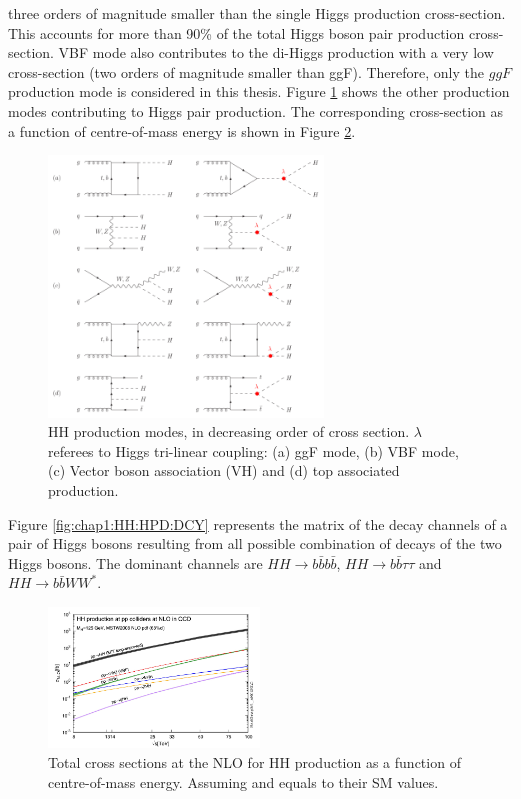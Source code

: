 three orders of magnitude smaller than the single Higgs production cross-section. This accounts for more than 90\% of the total Higgs boson pair production cross-section. VBF mode also contributes to the di-Higgs production with a very low cross-section (two orders of magnitude smaller than ggF). Therefore, only the $ggF$ production mode is considered in this thesis. Figure \ref{fig:chap1:HH:HPD:FYS} shows the other production modes contributing to Higgs pair production. The corresponding cross-section as a function of centre-of-mass energy is shown in Figure \ref{fig:chap1:HH:BSM:XSEC:S}. \\
\begin{figure}[htbp]
    \centering
    \includegraphics[width=0.65\textwidth]{Ch1/Img/HH_feyns.png}
    \caption{HH production modes, in decreasing order of cross section. $\lambda$ referees to Higgs tri-linear coupling: (a) ggF mode, (b) VBF mode, (c) Vector boson association (VH) and (d) top associated production.}
    \label{fig:chap1:HH:HPD:FYS}
\end{figure}
Figure \ref{fig:chap1:HH:HPD:DCY} represents the matrix of the decay channels of a pair of Higgs bosons resulting from all possible combination of decays of the two Higgs bosons. The dominant channels are $HH\rightarrow b\bar{b}b\bar{b}$, $HH\rightarrow b\bar{b}\tau\tau$ and $HH\rightarrow b\bar{b}WW^*$.
\begin{figure}[htbp]
    \centering
    \includegraphics[width=0.5\textwidth]{Ch1/Img/HH_XSec_as_S.png}
    \caption{Total cross sections at the NLO for HH production as a function of centre-of-mass energy. Assuming \kl and \kt equals to their SM values.}
    \label{fig:chap1:HH:BSM:XSEC:S}
\end{figure}
